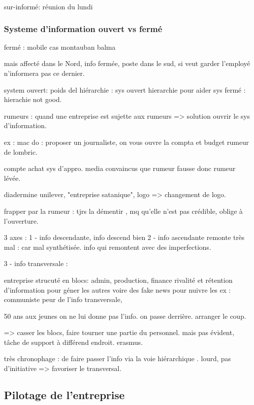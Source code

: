 \documentclass[a4paper,12pt]{article}
\begin{document}
sur-informé: réunion du lundi

 \subsubsection{Systeme d'information ouvert vs fermé}
 
 fermé : mobile cas montauban balma
 
 mais affecté dans le Nord,
 info fermée, poste dans le sud, si veut garder l'employé n'informera pas ce dernier.
 
 system ouvert: poids del hiérarchie : sys ouvert hierarchie pour aider
 sys fermé : hierachie not good.
 
 rumeurs : quand une entreprise est sujette aux rumeurs => solution ouvrir le sys d'information.
 
 ex : mac do : proposer un journaliste, on vous ouvre la compta et budget rumeur de lombric.
 
 compte achat sys d'appro. media convaincus que rumeur fausse donc rumeur lévée.
 
 diadermine unilever, "entreprise satanique", logo  => changement de logo.
 
 frapper par la rumeur : tjrs la démentir , mq qu'elle n'est pas crédible, oblige à l'ouverture.
 
 
 
 3 axes : 
 1 - info descendante, info descend bien
 2 - info ascendante remonte très mal : car mal synthétisée.
 info qui remontent avec des imperfections.
 
 3 - info transversale :
 
entreprise strucuté en blocs: admin, production, finance
rivalité et rétention d'information pour géner les autres voire des fake news
pour nuivre les
ex : communiste peur de l'info transversale, 

50 ans aux jeunes on ne lui donne pas l'info.
on passe derrière. arranger le coup.

=> casser les blocs, faire tourner une partie du personnel. mais pas évident, tâche
de support à différend endroit. erasmus.

très chronophage : de faire passer l'info via la voie hiérarchique .
lourd, pas d'initiative 
=> favoriser le transversal.

\subsection{Pilotage de l'entreprise}
\end{document}
